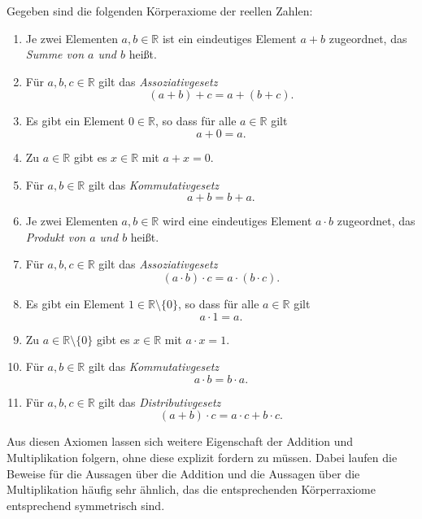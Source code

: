 \documentclass[a4paper,10pt]{article}
\title{}
\author{Jendrik Stelzner}
\date{\today}
\newcommand{\R}{\mathbb{R}}
\begin{document}
 Gegeben sind die folgenden Körperaxiome der reellen Zahlen:
 \begin{enumerate}[label=(K\arabic*)]
  \item
   Je zwei Elementen $a, b \in \R$ ist ein eindeutiges Element $a + b$ zugeordnet, das \emph{Summe von $a$ und $b$} heißt.
  \item
   Für $a, b, c \in \R$ gilt das \emph{Assoziativgesetz}
   \[
    (a + b) + c = a + (b + c).
   \]
  \item\label{existenz additiv neutral}
   Es gibt ein Element $0 \in \R$, so dass für alle $a \in \R$ gilt
   \[
    a + 0 = a.
   \]
  \item\label{existenz additiv invers}
   Zu $a \in \R$ gibt es $x \in \R$ mit $a + x = 0$.
  \item
   Für $a, b \in \R$ gilt das \emph{Kommutativgesetz}
   \[
    a + b = b + a.
   \]
  \item
   Je zwei Elementen $a, b \in \R$ wird eine eindeutiges Element $a \cdot b$ zugeordnet, das \emph{Produkt von $a$ und $b$} heißt.
  \item
   Für $a, b, c \in \R$ gilt das \emph{Assoziativgesetz}
   \[
    (a \cdot b) \cdot c = a \cdot (b \cdot c).
   \]
  \item\label{existenz multiplikativ neutral}
   Es gibt ein Element $1 \in \R \setminus \{0\}$, so dass für alle $a \in \R$ gilt
   \[
    a \cdot 1 = a.
   \]
  \item\label{existenz multiplikativ invers}
   Zu $a \in \R \setminus \{0\}$ gibt es $x \in \R$ mit $a \cdot x = 1$.
  \item
   Für $a, b \in \R$ gilt das \emph{Kommutativgesetz}
   \[
    a \cdot b = b \cdot a.
   \]
  \item
   Für $a, b, c \in \R$ gilt das \emph{Distributivgesetz}
   \[
    (a + b) \cdot c = a \cdot c + b \cdot c.
   \]
 \end{enumerate}
 
 Aus diesen Axiomen lassen sich weitere Eigenschaft der Addition und Multiplikation folgern, ohne diese explizit fordern zu müssen. Dabei laufen die Beweise für die Aussagen über die Addition und die Aussagen über die Multiplikation häufig sehr ähnlich, das die entsprechenden Körperraxiome entsprechend symmetrisch sind.
 
\end{document}
